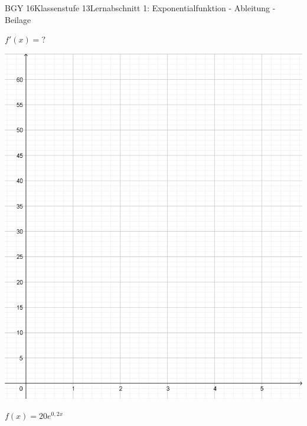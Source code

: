 \documentclass[oneside,openany,headings=optiontotoc,11pt,numbers=noenddot]{scrreprt}
\begin{document}
	\begin{worksheet}{BGY 16}{Klassenstufe 13}{Lernabschnitt 1: Exponentialfunktion - Ableitung - Beilage}
		\setcounter{page}{3}
		\begin{framed}
			\noindent
			\(f'(x) = ?\)\\
			\par\noindent
			\includegraphics[width=\textwidth]{../99_Bilder/01_ExpFkt/KoordLeerEFkt.png}\\
		\end{framed}
		\newpage
		\begin{framed}
			\noindent
			\(f(x) = 20e^{0,2x}\)\\
			\par\noindent

\end{framed}
\end{worksheet}
\end{document}
